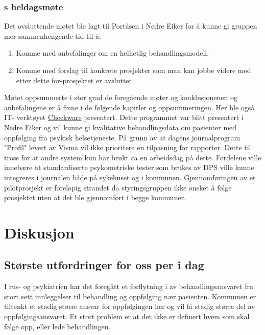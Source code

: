 \documentclass[11pt]{report} %
\begin{document}
                  \subsection{s heldagsmøte}\label{sec:agr_6}
                    Det avsluttende møtet ble lagt til Portåsen i Nedre Eiker for å kunne gi gruppen mer sammenhengende tid til å:
                      \begin{enumerate}
                        \item Komme med anbefalinger om en helhetlig behandlingsmodell.\\
                        \item Komme med forslag til konkrete prosjekter som man kan jobbe videre med etter dette for-prosjektet er avsluttet\\
                      \end{enumerate}
                    Møtet oppsummerte i stor grad de foregående møter og konklusjonenen og anbefalingene er å finne i de følgende kapitler og oppsummeringen. Her ble også IT- verktøyet \href{http://checkware.com/}{Checkware} presentert. Dette programmet var blitt presentert i Nedre Eiker og vil kunne gi kvalitative behandlingsdata om pasienter med oppfølging fra psykisk helsetjeneste. På grunn av at dagens journalprogram "Profil" levert av Visma vil ikke prioritere en tilpasning for rapporter. Dette til tross for at andre system kun har brukt ca en arbeidsdag på dette. Fordelene ville innebære at standardiserte psykometriske tester som brukes av DPS ville kunne integreres i journalen både på sykehuset og i kommunen. \label{cw_pilot}Gjennomføringen av et pilotprosjekt er foreløpig strandet da styringsgruppen ikke ønsket å følge prosjektet uten at det ble gjennomført i begge kommuner.

              \chapter{Diskusjon}\label{chap:disk}
                \section{Største utfordringer for oss per i dag} \label{chap:disk_utf}
                  I rus- og psykiatrien har det foregått et forflytning i av behandlingsansvaret fra stort sett innleggelser til behandling og oppfølging nær pasienten. Kommunen er tiltenkt et stadig større ansvar for oppfølgingen her og vil få stadig større del av oppfølgingsansvaret. Et stort problem er at det ikke er definert hvem som skal følge opp, eller lede behandlingen.
\end{document}
